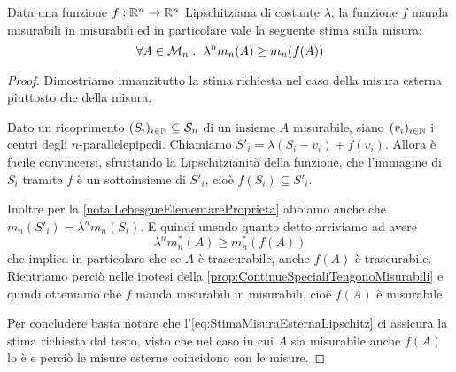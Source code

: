 \begin{proposition}\label{prop:LipschitzTengonoMisurabili}
	Data una funzione $f:\mathbb R^n\to\mathbb R^n$ Lipschitziana di costante $\lambda$, la funzione $f$ manda misurabili in misurabili ed in particolare vale la seguente stima sulla misura:
	\begin{equation*}
		\forall A\in\mathcal M_n:\ \lambda^n m_n(A) \ge m_n(f(A))
	\end{equation*}
\end{proposition}
\begin{proof}
	Dimostriamo innanzitutto la stima richiesta nel caso della misura esterna piuttosto che della misura.
	
	Dato un ricoprimento $(S_i)_{i\in\mathbb N}\subseteq \mathcal S_n$ di un insieme $A$ misurabile, siano $(v_i)_{i\in\mathbb N}$ i centri degli $n$-parallelepipedi.
	Chiamiamo $S'_i=\lambda(S_i-v_i)+f(v_i)$.
	Allora è facile convincersi, sfruttando la Lipschitzianità della funzione, che l'immagine di $S_i$ tramite $f$ è un sottoinsieme di $S'_i$, cioè $f(S_i)\subseteq S'_i$.
	
	Inoltre per la \cref{nota:LebesgueElementareProprieta} abbiamo anche che $m_n(S'_i)=\lambda^n m_n(S_i)$. 
	E quindi unendo quanto detto arriviamo ad avere
	\begin{equation}\label{eq:StimaMisuraEsternaLipschitz}
		\lambda^n m_n^*(A) \ge m_n^*(f(A)) 
	\end{equation}
	che implica in particolare che se $A$ è trascurabile, anche $f(A)$ è trascurabile.
	Rientriamo perciò nelle ipotesi della \cref{prop:ContinueSpecialiTengonoMisurabili} e quindi otteniamo che $f$ manda misurabili in misurabili, cioè $f(A)$ è misurabile.
	
	Per concludere basta notare che l'\cref{eq:StimaMisuraEsternaLipschitz} ci assicura la stima richiesta dal testo, visto che nel caso in cui $A$ sia misurabile anche $f(A)$ lo è e perciò le misure esterne coincidono con le misure.
\end{proof}



